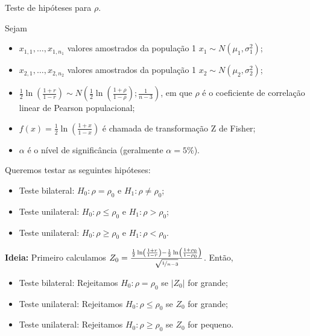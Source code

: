 \documentclass[9pt]{beamer}
\begin{document}
\begin{frame}{Teste de hipóteses para $\rho$.}

\small

Sejam
\begin{itemize}
	\item $x_{1,1}, \dots, x_{1, n_1}$ valores amostrados da população 1 $x_1 \sim N(\mu_1, \sigma_1^2)$;
	\item $x_{2,1}, \dots, x_{2, n_2}$ valores amostrados da população 1 $x_2 \sim N(\mu_2, \sigma_2^2)$;
	\item $\frac{1}{2} \ln \left( \frac{1 + r}{1 - r} \right) \sim N \left( \frac{1}{2} \ln \left( \frac{1 + \rho}{1 - \rho}\right); \frac{1}{n-3}  \right)$, em que $\rho$ é o coeficiente de correlação linear de Pearson populacional;
	\item $f(x) = \frac{1}{2} \ln \left( \frac{1 + x}{1 - x} \right)$ é chamada de transformação Z de Fisher;
	\item $\alpha$ é o nível de significância (geralmente $\alpha=5\%$). 
\end{itemize}
\vfill

Queremos testar as seguintes hipóteses:
\begin{itemize}
	\item Teste bilateral: $H_0: \rho = \rho_0$ e $H_1: \rho \neq \rho_0$;
	\item Teste unilateral: $H_0: \rho \leq \rho_0$ e $H_1: \rho > \rho_0$;
	\item Teste unilateral: $H_0: \rho \geq \rho_0$ e $H_1: \rho < \rho_0$.
\end{itemize}
\vfill

\textbf{Ideia:} Primeiro calculamos $Z_0 = \frac{ \frac{1}{2} \ln \left( \frac{1 + r}{1 - r} \right) - \frac{1}{2} \ln \left( \frac{1 + \rho_0}{1 - \rho_0} \right) }{\sqrt{\nicefrac{1}{n-3}}}$. Então, 
\begin{itemize}
	\item Teste bilateral: Rejeitamos $H_0: \rho = \rho_0$ se $\lvert Z_0 \rvert$ for grande;
	\item Teste unilateral: Rejeitamos $H_0: \rho \leq \rho_0$ se $Z_0 $ for grande;
	\item Teste unilateral: Rejeitamos $H_0: \rho \geq \rho_0$ se $Z_0 $ for pequeno.
\end{itemize}

\normalsize
\end{frame}
\end{document}
